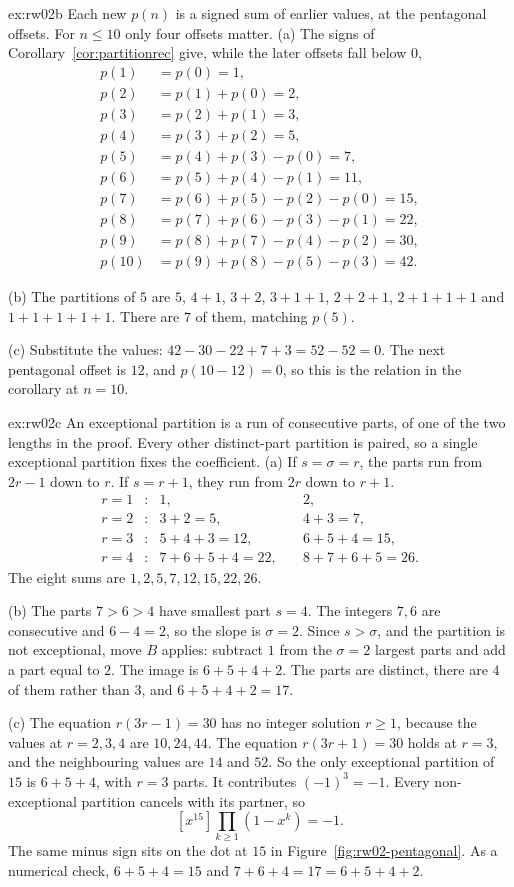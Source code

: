 \begin{solution}{ex:rw02b}
\idea Each new $p(n)$ is a signed sum of earlier values, at the pentagonal offsets. For $n\le10$ only four offsets matter.
\writeup (a) The signs of Corollary~\ref{cor:partitionrec} give, while the later offsets fall below $0$,
\begin{align*}
p(1)&=p(0)=1,\\
p(2)&=p(1)+p(0)=2,\\
p(3)&=p(2)+p(1)=3,\\
p(4)&=p(3)+p(2)=5,\\
p(5)&=p(4)+p(3)-p(0)=7,\\
p(6)&=p(5)+p(4)-p(1)=11,\\
p(7)&=p(6)+p(5)-p(2)-p(0)=15,\\
p(8)&=p(7)+p(6)-p(3)-p(1)=22,\\
p(9)&=p(8)+p(7)-p(4)-p(2)=30,\\
p(10)&=p(9)+p(8)-p(5)-p(3)=42.
\end{align*}

(b) The partitions of $5$ are $5$, $4+1$, $3+2$, $3+1+1$, $2+2+1$, $2+1+1+1$ and $1+1+1+1+1$. There are $7$ of them, matching $p(5)$.

(c) Substitute the values: $42-30-22+7+3=52-52=0$. The next pentagonal offset is $12$, and $p(10-12)=0$, so this is the relation in the corollary at $n=10$.
\end{solution}

\begin{solution}{ex:rw02c}
\idea An exceptional partition is a run of consecutive parts, of one of the two lengths in the proof. Every other distinct-part partition is paired, so a single exceptional partition fixes the coefficient.
\writeup (a) If $s=\sigma=r$, the parts run from $2r-1$ down to $r$. If $s=r+1$, they run from $2r$ down to $r+1$.
\begin{align*}
r=1&\colon& 1,&\quad 2,\\
r=2&\colon& 3+2=5,&\quad 4+3=7,\\
r=3&\colon& 5+4+3=12,&\quad 6+5+4=15,\\
r=4&\colon& 7+6+5+4=22,&\quad 8+7+6+5=26.
\end{align*}
The eight sums are $1,2,5,7,12,15,22,26$.

(b) The parts $7>6>4$ have smallest part $s=4$. The integers $7,6$ are consecutive and $6-4=2$, so the slope is $\sigma=2$. Since $s>\sigma$, and the partition is not exceptional, move $B$ applies: subtract $1$ from the $\sigma=2$ largest parts and add a part equal to $2$. The image is $6+5+4+2$. The parts are distinct, there are $4$ of them rather than $3$, and $6+5+4+2=17$.

(c) The equation $r(3r-1)=30$ has no integer solution $r\ge1$, because the values at $r=2,3,4$ are $10,24,44$. The equation $r(3r+1)=30$ holds at $r=3$, and the neighbouring values are $14$ and $52$. So the only exceptional partition of $15$ is $6+5+4$, with $r=3$ parts. It contributes $(-1)^3=-1$. Every non-exceptional partition cancels with its partner, so
\[
[x^{15}]\prod_{k\ge1}(1-x^k)=-1.
\]
The same minus sign sits on the dot at $15$ in Figure~\ref{fig:rw02-pentagonal}. As a numerical check, $6+5+4=15$ and $7+6+4=17=6+5+4+2$.
\end{solution}

